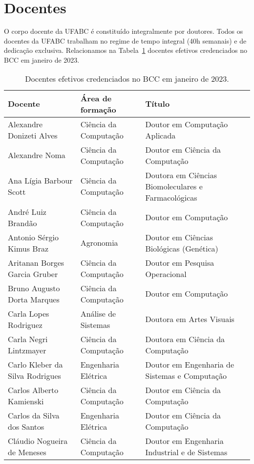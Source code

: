 \section{Docentes}
\label{sec:docentes}

O corpo docente da UFABC é constituído integralmente por doutores.
Todos os docentes da UFABC trabalham no regime de tempo integral (40h semanais)
e de dedicação exclusiva.
Relacionamos na Tabela~\ref{tab:docentes} docentes efetivos credenciados no BCC em janeiro de
2023.

{\small
\begin{longtable}{|p{}|p{}|p{}|}
    \caption{Docentes efetivos credenciados no BCC em janeiro de 2023.}
    \label{tab:docentes}
    \endfirsthead
    \endhead

    \hline
    \textbf{Docente} & \textbf{Área de formação} & \textbf{Título} \\
    \hline\hline
    Alexandre Donizeti Alves & Ciência da Computação & Doutor em Computação Aplicada \\
    Alexandre Noma & Ciência da Computação & Doutor em Ciência da Computação \\
    Ana Lígia Barbour Scott & Ciência da Computação & Doutora em Ciências Biomoleculares e Farmacológicas \\
    André Luiz Brandão & Ciência da Computação & Doutor em Computação \\
    Antonio Sérgio Kimus Braz & Agronomia & Doutor em Ciências Biológicas (Genética) \\
    Aritanan Borges Garcia Gruber & Ciência da Computação & Doutor em Pesquisa Operacional \\
    Bruno Augusto Dorta Marques & Ciência da Computação & Doutor em Computação \\
    Carla Lopes Rodriguez & Análise de Sistemas & Doutora em Artes Visuais \\
    Carla Negri Lintzmayer & Ciência da Computação & Doutora em Ciência da Computação \\
    Carlo Kleber da Silva Rodrigues & Engenharia Elétrica & Doutor em Engenharia de Sistemas e Computação \\
    Carlos Alberto Kamienski & Ciência da Computação & Doutor em Ciência da Computação \\
    Carlos da Silva dos Santos & Engenharia Elétrica & Doutor em Ciência da Computação \\
    Cláudio Nogueira de Meneses & Ciência da Computação & Doutor em Engenharia Industrial e de Sistemas \\

\end{longtable}}
